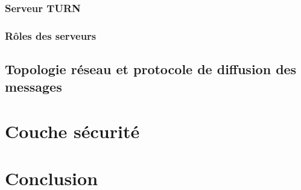 \subsubsection{Serveur TURN}


\subsubsection{Rôles des serveurs}


\subsection{Topologie réseau et protocole de diffusion des messages}




\section{Couche sécurité}


\section{Conclusion}

